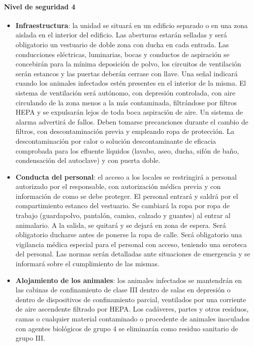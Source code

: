 \paragraph{Nivel de seguridad 4}
\begin{itemize}[itemsep=0pt,parsep=0pt,topsep=0pt,partopsep=0pt]
    \item \textbf{Infraestructura}: la unidad se situará en un edificio separado o en una zona aislada en el interior del edificio. Las aberturas estarán selladas y será obligatorio un vestuario de doble zona con ducha en cada entrada. Las conducciones eléctricas, luminarias, bocas y conductos de aspiración se concebirán para la mínima deposición de polvo, los circuitos de ventilación serán estancos y las puertas deberán cerrase con llave. Una señal indicará cuando los animales infectados estén presentes en el interior de la misma.  El sistema de ventilación será autónomo, con depresión controlada, con aire circulando de la zona menos a la más contaminada, filtrándose por filtros HEPA y se expulsarán lejos de toda boca aspiración de aire. Un sistema de alarma advertirá de fallos. Deben tomarse precauciones durante el cambio de filtros, con descontaminación previa y empleando ropa de protección. La descontaminación por calor o solución descontaminante de eficacia comprobada para los efluente líquidos (lavabo, aseo, ducha, sifón de baño, condensación del autoclave) y con puerta doble.
    \item \textbf{Conducta del personal}: el acceso a los locales se restringirá a personal autorizado por el responsable, con autorización médica previa y con información de como se debe proteger. El personal entrará y saldrá por el compartimiento estanco del vestuario. Se cambiará la ropa por ropa de trabajo (guardapolvo, pantalón, camisa, calzado y guantes) al entrar al animalario. A la salida, se quitará y se dejará en zona de espera. Será obligatorio ducharse antes de ponerse la ropa de calle. Será obligatorio una vigilancia médica especial para el personal con acceso, teniendo una seroteca del personal. Las normas serán detalladas ante situaciones de emergencia y se informará sobre el cumplimiento de las mismas.
    \item \textbf{Alojamiento de los animales}: los animales infectados se mantendrán en las cabinas de confinamiento de clase III dentro de salas en depresión o dentro de dispositivos de confinamiento parcial, ventilados por una corriente de aire ascendente filtrado por HEPA. Los cadáveres, partes y otros residuos, camas o cualquier material contaminado o procedente de animales inoculados con agentes biológicos de grupo 4 se eliminarán como residuo sanitario de grupo III.
\end{itemize}
